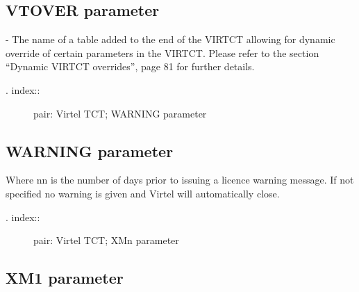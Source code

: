\documentclass[letterpaper,10pt,english]{sphinxmanual}
\begin{document}
\subsection{VTOVER parameter}
\label{\detokenize{Installation_Guide:id5}}
\begin{sphinxVerbatim}[commandchars=\\\{\}]
 
\end{sphinxVerbatim}

 - The name of a table added to the end of the VIRTCT allowing for dynamic override of certain parameters in the VIRTCT. Please refer to the section “Dynamic VIRTCT overrides”, page 81 for further details.
\begin{description}
\item[{. index::}] \leavevmode
pair: Virtel TCT; WARNING parameter

\end{description}


\subsection{WARNING parameter}
\label{\detokenize{Installation_Guide:warning-parameter}}
\begin{sphinxVerbatim}[commandchars=\\\{\}]
\end{sphinxVerbatim}

Where nn is the number of days prior to issuing a licence warning message. If not specified no warning is given and Virtel will automatically close.
\begin{description}
\item[{. index::}] \leavevmode
pair: Virtel TCT; XMn parameter

\end{description}


\subsection{XM1 parameter}
\label{\detokenize{Installation_Guide:xm1-parameter}}
\begin{sphinxVerbatim}[commandchars=\\\{\}]
   
\PYG{p}{[}\PYG{p}{]}
\end{sphinxVerbatim}
\end{document}
